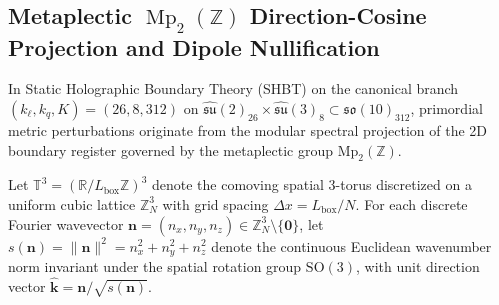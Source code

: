 \documentclass[11pt]{article}
\theoremstyle{plain}
\begin{document}
\subsection{Metaplectic \texorpdfstring{$\operatorname{Mp}_2(\mathbb{Z})$}{Mp2(Z)} Direction-Cosine Projection and Dipole Nullification}
\label{app:mp2-direction-cosine-dipole}
In Static Holographic Boundary Theory (SHBT) on the canonical branch $(k_\ell, k_q, K) = (26, 8, 312)$ on $\widehat{\mathfrak{su}}(2)_{26} \times \widehat{\mathfrak{su}}(3)_8 \subset \widehat{\mathfrak{so}}(10)_{312}$, primordial metric perturbations originate from the modular spectral projection of the 2D boundary register governed by the metaplectic group $\mathrm{Mp}_2(\mathbb{Z})$.

Let $\mathbb{T}^3 = (\mathbb{R} / L_{\mathrm{box}}\mathbb{Z})^3$ denote the comoving spatial 3-torus discretized on a uniform cubic lattice $\mathbb{Z}_N^3$ with grid spacing $\Delta x = L_{\mathrm{box}} / N$. For each discrete Fourier wavevector $\mathbf{n} = (n_x, n_y, n_z) \in \mathbb{Z}_N^3 \setminus \{\mathbf{0}\}$, let $s(\mathbf{n}) = \|\mathbf{n}\|^2 = n_x^2 + n_y^2 + n_z^2$ denote the continuous Euclidean wavenumber norm invariant under the spatial rotation group $\mathrm{SO}(3)$, with unit direction vector $\hat{\mathbf{k}} = \mathbf{n}/\sqrt{s(\mathbf{n})}$.
\end{document}
